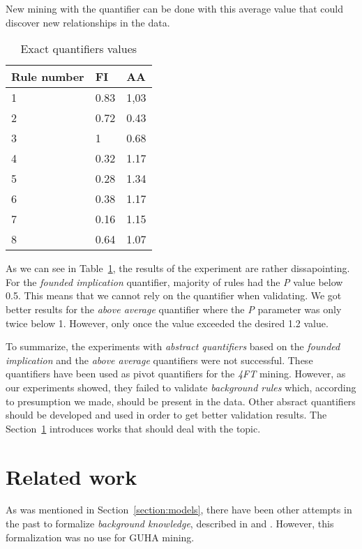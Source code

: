 \documentclass{llncs}
\begin{document}
New mining with the quantifier can be done with this average
value that could discover new relationships in the data.

\begin{table}[h]
	\centering
	\begin{tabular}{|p{}|p{}|p{}|}
		\hline
		\textbf{Rule number}&\textbf{FI}&\textbf{AA}\\
		\hline
		1&0.83&1,03\\
		\hline
		2&0.72&0.43\\
		\hline
		3&1&0.68\\
		\hline
		4&0.32&1.17\\
		\hline
		5&0.28&1.34\\
		\hline
		6&0.38&1.17\\
		\hline
		7&0.16&1.15\\
		\hline
		8&0.64&1.07\\
		\hline
	\end{tabular}
\caption{Exact quantifiers values}
\label{tab:validation2}
\end{table}

As we can see in Table~\ref{tab:validation2}, the results of the experiment
are rather dissapointing. For the \emph{founded implication} quantifier, majority
of rules had the \emph{P} value below 0.5. This means that we cannot rely on
the quantifier when validating. We got better results for the \emph{above average}
quantifier where the \emph{P} parameter was only twice below 1. However, only once
the value exceeded the desired 1.2 value. 

To summarize, the experiments with \emph{abstract quantifiers} based on the 
\emph{founded implication} and the \emph{above average} quantifiers were not 
successful. These quantifiers have been used as pivot quantifiers for the \emph{4FT}
mining. However, as our experiments showed, they failed to validate \emph{background
rules} which, according to presumption we made, should be present in the data. 
Other absract quantifiers should be developed and used in order to get better
validation results. The Section~\ref{section:related} introduces works that
should deal with the topic. 

\section{Related work}
\label{section:related}

As was mentioned in Section~\ref{section:models}, there have been other attempts
in the past to formalize \emph{background knowledge}, described in \cite{Qualitative1}
and \cite{Qualitative2}. However, this formalization was no use for GUHA mining. 
\end{document}
